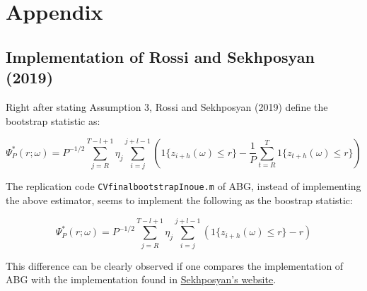 \documentclass[
  11pt,
]{article}
\begin{document}
\newpage

\hypertarget{appendix}{%
\section{Appendix}\label{appendix}}

\hypertarget{implementation-of-rossi-and-sekhposyan-2019}{%
\subsection{Implementation of Rossi and Sekhposyan
(2019)}\label{implementation-of-rossi-and-sekhposyan-2019}}

Right after stating Assumption 3, Rossi and Sekhposyan (2019) define the
bootstrap statistic as:

\[
\Psi_P^*(r; \omega) = P^{-1/2}\sum_{j=R}^{T-l+1}\eta_j \sum_{i=j}^{j+l-1} \left ( 1\{z_{i+h}(\omega) \leq r \} - \frac{1}{P}\sum_{t=R}^{T}1\{z_{t+h}(\omega) \leq r \} \right )
\]

The replication code \texttt{CVfinalbootstrapInoue.m} of ABG, instead of
implementing the above estimator, seems to implement the following as
the boostrap statistic:

\[
\Psi_P^*(r; \omega) = P^{-1/2}\sum_{j=R}^{T-l+1}\eta_j \sum_{i=j}^{j+l-1} \left ( 1\{z_{i+h}(\omega) \leq r \} - r \right )
\]

This difference can be clearly observed if one compares the
implementation of ABG with the implementation found in
\href{http://www.tateviksekhposyan.org/example.zip}{Sekhposyan's
website}.
\end{document}

